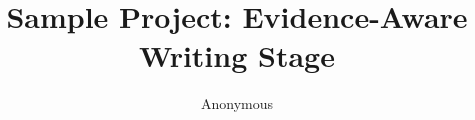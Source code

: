 \documentclass{article}
\title{Sample Project: Evidence-Aware Writing Stage}
\author{Anonymous}
\date{}
\begin{document}
\maketitle
\begin{abstract}

\end{abstract}










\end{document}
